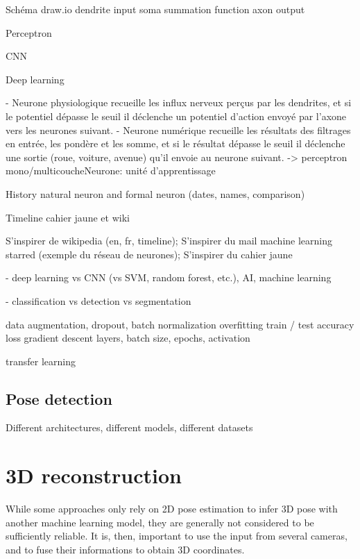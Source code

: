 Schéma draw.io
dendrite input
soma summation function
axon output

Perceptron \cite{Rosenblatt1958}

CNN

Deep learning

- Neurone physiologique recueille les influx nerveux perçus par les dendrites, et si le potentiel dépasse le seuil il déclenche un potentiel d'action envoyé par l'axone vers les neurones suivant.
- Neurone numérique recueille les résultats des filtrages en entrée, les pondère et les somme, et si le résultat dépasse le seuil il déclenche une sortie (roue, voiture, avenue) qu'il envoie au neurone suivant. -> perceptron mono/multicoucheNeurone: unité d'apprentissage



History natural neuron and formal neuron (dates, names, comparison)

Timeline cahier jaune et wiki

S'inspirer de wikipedia (en, fr, timeline); 
S'inspirer du mail machine learning starred (exemple du réseau de neurones); 
S'inspirer du cahier jaune


- deep learning vs CNN (vs SVM, random forest, etc.), AI, machine learning

- classification vs detection vs segmentation

data augmentation, dropout, batch normalization
overfitting
train / test
accuracy loss
gradient descent
layers, batch size, epochs, activation

transfer learning



\subsection{Pose detection}

Different architectures, different models, different datasets


\section{3D reconstruction}\label{sec:3D reconstruction}

While some approaches only rely on 2D pose estimation to infer 3D pose with another machine learning model, they are generally not considered to be sufficiently reliable. It is, then, important to use the input from several cameras, and to fuse their informations to obtain 3D coordinates.


